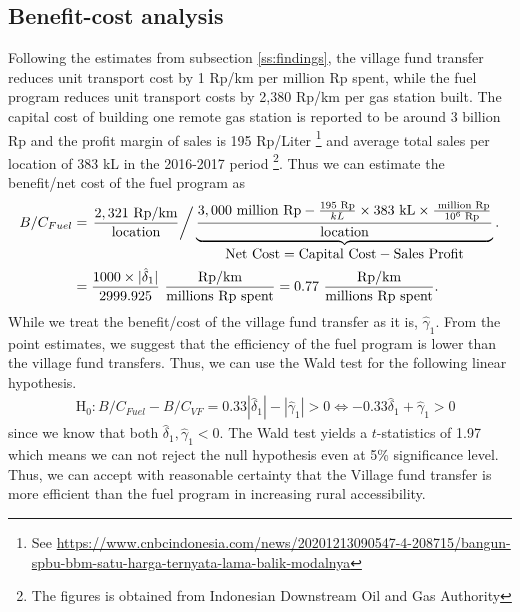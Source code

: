 \documentclass[letterpaper,12pt,leqno]{article}
\newcommand{\Hy}{\text{H}}
\begin{document}
\subsection{Benefit-cost analysis}
Following the estimates from subsection \ref{ss:findings}, the village fund transfer reduces unit transport cost by 1 Rp/km per million Rp spent, while the fuel program reduces unit transport costs by 2,380 Rp/km per gas station built. The capital cost of building one remote gas station is reported to be around 3 billion Rp and the profit margin of sales is 195 Rp/Liter \footnote{See \href{https://www.cnbcindonesia.com/news/20201213090547-4-208715/bangun-spbu-bbm-satu-harga-ternyata-lama-balik-modalnya}{https://www.cnbcindonesia.com/news/20201213090547-4-208715/bangun-spbu-bbm-satu-harga-ternyata-lama-balik-modalnya}} and average total sales per location of 383 kL in the 2016-2017 period \footnote{The figures is obtained from Indonesian Downstream Oil and Gas Authority}.
Thus we can estimate the benefit/net cost of the fuel program as
\begin{align*}
   B/C_{Fuel}&=\left.\frac{2,321 \text{ Rp/km}}{\text{location}}\right/ \underbrace{\frac{3,000 \text{ million Rp}-\frac{195\text{ Rp}}{kL}\times 383\text{ kL}\times\frac{\text{ million Rp}}{10^6\text{ Rp}}}{\text{location}}}_{\displaystyle \text{Net Cost} = \text{Capital Cost} - \text{Sales Profit}}.\\
   &= \frac{1000 \times |\hat{\delta}_1|}{2999.925} \ \frac{\text{Rp/km}}{\text{millions Rp spent}}=0.77\ \frac{\text{Rp/km}}{\text{millions Rp spent}}.
\end{align*}
While we treat the benefit/cost of the village fund transfer as it is, $\hat{\gamma}_1$. From the point estimates, we suggest that the efficiency of the fuel program is lower than the village fund transfers. Thus, we can use the Wald test for the following linear hypothesis.
\begin{align*}
    &\Hy_0: B/C_{Fuel}-B/C_{VF}=0.33|\hat{\delta}_1|-|\hat{\gamma}_1|>0 \Leftrightarrow -0.33\hat{\delta}_1+\hat{\gamma}_1>0
\end{align*}
since we know that both $\hat{\delta}_1,\hat{\gamma}_1<0$. The Wald test yields a $t$-statistics of 1.97 which means we can not reject the null hypothesis even at 5\% significance level. Thus, we can accept with reasonable certainty that the Village fund transfer is more efficient than the fuel program in increasing rural accessibility.
\end{document}
